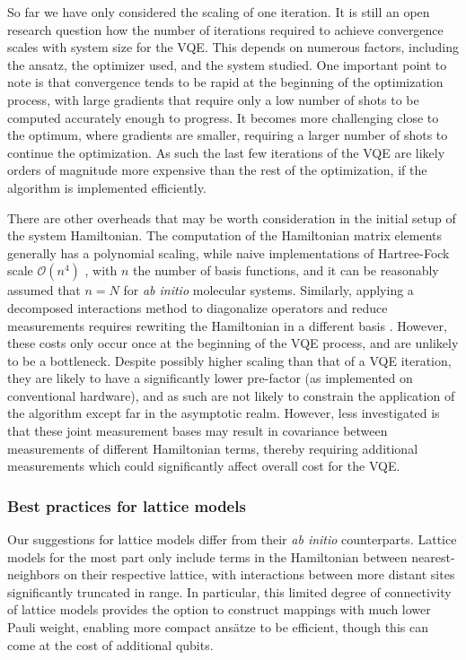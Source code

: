 So far we have only considered the scaling of one iteration. It is still an open research question how the number of iterations required to achieve convergence scales with system size for the VQE. This depends on numerous factors, including the ansatz, the optimizer used, and the system studied. One important point to note is that convergence tends to be rapid at the beginning of the optimization process, with large gradients that require only a low number of shots to be computed accurately enough to progress. It becomes more challenging close to the optimum, where gradients are smaller, requiring a larger number of shots to continue the optimization. As such the last few iterations of the VQE are likely orders of magnitude more expensive than the rest of the optimization, if the algorithm is implemented efficiently.  

There are other overheads that may be worth consideration in the initial setup of the system Hamiltonian. The computation of the Hamiltonian matrix elements generally has a polynomial scaling, while naive implementations of Hartree-Fock scale $\mathcal{O}(n^4)$ \cite{Koppl2016}, with $n$ the number of basis functions, and it can be reasonably assumed that $n=N$ for \textit{ab initio} molecular systems. Similarly, applying a decomposed interactions method to diagonalize operators and reduce measurements requires rewriting the Hamiltonian in a different basis \cite{Huggins2021, Yen2021_Cartan}. However, these costs only occur once at the beginning of the VQE process, and are unlikely to be a bottleneck. Despite possibly higher scaling than that of a VQE iteration, they are likely to have a significantly lower pre-factor (as implemented on conventional hardware), and as such are not likely to constrain  the application of the algorithm except far in the asymptotic realm. However, less investigated is that these joint measurement bases may result in covariance between measurements of different Hamiltonian terms, thereby requiring additional measurements \cite{mccleanTheoryVariationalHybrid2015, Crawford2021, Huggins2021, Yen2021_Cartan} which could significantly affect overall cost for the VQE.

\subsubsection{Best practices for lattice models}

Our suggestions for lattice models differ from their {\em ab initio} counterparts. Lattice models for the most part only include terms in the Hamiltonian between nearest-neighbors on their respective lattice, with interactions between more distant sites significantly truncated in range. 
In particular, this limited degree of connectivity of lattice models provides the option to construct mappings with much lower Pauli weight, enabling more compact ans{\"{a}}tze to be efficient, though this can come at the cost of additional qubits.


